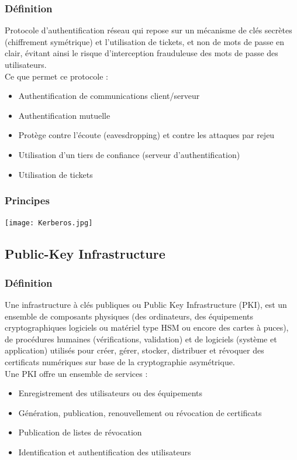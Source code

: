 \documentclass{report}
\begin{document}
\subsubsection{Définition}

Protocole d'authentification réseau qui repose sur un mécanisme de clés secrètes (chiffrement symétrique) et l'utilisation de tickets, et non de mots de passe en clair, évitant ainsi le risque d'interception frauduleuse des mots de passe des utilisateurs.\\

Ce que permet ce protocole :
\begin{itemize}
    \item Authentification de communications client/serveur
    \item Authentification mutuelle
    \item Protège contre l’écoute (eavesdropping) et contre
les attaques par rejeu
    \item Utilisation d’un tiers de confiance (serveur
d’authentification)
    \item Utilisation de tickets
\end{itemize}

\subsubsection{Principes}

\texttt{[image: Kerberos.jpg]}

\subsection{Public-Key Infrastructure}

\subsubsection{Définition}

Une infrastructure à clés publiques ou Public Key Infrastructure (PKI), est un ensemble de composants physiques (des ordinateurs, des équipements cryptographiques logiciels ou matériel type HSM ou encore
des cartes à puces), de procédures humaines (vérifications, validation) et de logiciels (système et application) utilisés pour créer, gérer, stocker, distribuer et révoquer des certificats numériques sur base de la cryptographie asymétrique.\\

Une PKI offre un ensemble de services :
\begin{itemize}
    \item Enregistrement des utilisateurs ou des
équipements
    \item Génération, publication, renouvellement ou
révocation de certificats
    \item Publication de listes de révocation
    \item Identification et authentification des
utilisateurs
\end{itemize}
\end{document}
